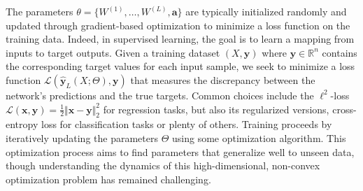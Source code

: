 \documentclass[letterpaper, 10pt, dvipsnames]{article}
\numberwithin{equation}{section}
\newcommand{\x}{\mathbf{x}}
\newcommand{\y}{\mathbf{y}}
\renewcommand{\hat}{\widehat}
\theoremstyle{definition}
\begin{document}
  The parameters $\theta = \{W^{(1)},\dots,W^{(L)}, \mathbf{a}\}$ are typically initialized randomly and updated through gradient-based optimization to minimize a loss function on the training data. Indeed, in supervised learning, the goal is to learn a mapping from inputs to target outputs. Given a training dataset $(X, \mathbf{y})$ where $\mathbf{y} \in \mathbb{R}^n$ contains the corresponding target values for each input sample, we seek to minimize a loss function $\mathcal{L}(\hat{\y}_L(X; \Theta), \y)$ that measures the discrepancy between the network's predictions and the true targets. Common choices include the $\ell^2$-loss $\mathcal{L}(\x, \y) = \frac{1}{2}\Vert \x - \y\Vert_2^2$ for regression tasks, but also its regularized versions, cross-entropy loss for classification tasks or plenty of others. Training proceeds by iteratively updating the parameters $\Theta$ using some optimization algorithm. This optimization process aims to find parameters that generalize well to unseen data, though understanding the dynamics of this high-dimensional, non-convex optimization problem has remained challenging.
\end{document}

